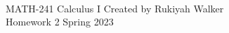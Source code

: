 \documentclass[addpoints, 12pt]{exam}%
\begin{document}
	\noindent \hrulefill \\
	MATH-241 Calculus I \hfill Created by Rukiyah Walker\\
	Homework 2 \hfill Spring 2023\\\vspace*{-0.7cm}
	
	\noindent\hrulefill
	
\vspace*{0.5cm}

\end{document}
